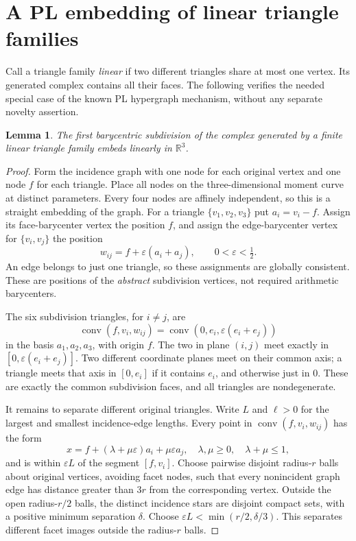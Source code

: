 \documentclass[11pt]{article}
\newtheorem{lemma}[theorem]{Lemma}
\newcommand{\R}{\mathbb R}
\newcommand{\conv}{\operatorname{conv}}
\begin{document}
\section{A PL embedding of linear triangle families}
Call a triangle family \emph{linear} if two different triangles share at
most one vertex. Its generated complex contains all their faces.
The following verifies the needed special case of the known PL
hypergraph mechanism, without any separate novelty assertion.

\begin{lemma}\label{lem:PL}
The first barycentric subdivision of the complex generated by a finite
linear triangle family embeds linearly in $\R^3$.
\end{lemma}
\begin{proof}
Form the incidence graph with one node for each original vertex and one
node $f$ for each triangle. Place all nodes on the three-dimensional
moment curve at distinct parameters. Every four nodes are affinely
independent, so this is a straight embedding of the graph.
For a triangle $\{v_1,v_2,v_3\}$ put $a_i=v_i-f$.
Assign its face-barycenter vertex the position $f$, and assign the
edge-barycenter vertex for $\{v_i,v_j\}$ the position
\[
w_{ij}=f+\varepsilon(a_i+a_j),\qquad 0<\varepsilon<\tfrac12.
\]
An edge belongs to just one triangle, so these assignments are globally
consistent. These are positions of the \emph{abstract} subdivision
vertices, not required arithmetic barycenters.

The six subdivision triangles, for $i\ne j$, are
\[
\conv(f,v_i,w_{ij})=\conv(0,e_i,\varepsilon(e_i+e_j))
\]
in the basis $a_1,a_2,a_3$, with origin $f$.
The two in plane $(i,j)$ meet exactly in
$[0,\varepsilon(e_i+e_j)]$. Two different coordinate planes meet on
their common axis; a triangle meets that axis in $[0,e_i]$ if it
contains $e_i$, and otherwise just in $0$.
These are exactly the common subdivision faces, and all triangles
are nondegenerate.

It remains to separate different original triangles. Write $L$ and
$\ell>0$ for the largest and smallest incidence-edge lengths.
Every point in $\conv(f,v_i,w_{ij})$ has the form
\[
x=f+(\lambda+\mu\varepsilon)a_i+\mu\varepsilon a_j,\quad
\lambda,\mu\ge0,\quad\lambda+\mu\le1,
\]
and is within $\varepsilon L$ of the segment $[f,v_i]$.
Choose pairwise disjoint radius-$r$ balls about original vertices,
avoiding facet nodes, such that every nonincident graph edge has
distance greater than $3r$ from the corresponding vertex.
Outside the open radius-$r/2$ balls, the distinct incidence stars
are disjoint compact sets, with a positive minimum separation
$\delta$. Choose $\varepsilon L<\min(r/2,\delta/3)$.
This separates different facet images outside the radius-$r$ balls.


\end{proof}
\end{document}
